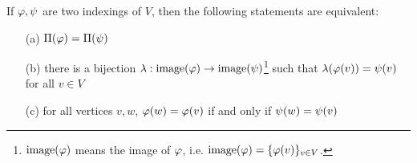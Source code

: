 \begin{samepage}
    \begin{theoremrep}
        If $\varphi,\psi$ are two indexings of $V$, then the following statements are equivalent:
        \begin{enumerate}
            \item[(a)] $\Pi(\varphi)=\Pi(\psi)$
            \item[(b)] there is a bijection $\lambda : \mathrm{image}(\varphi) \rightarrow \mathrm{image}(\psi)$\footnote{$\mathrm{image}(\varphi)$ means the image of $\varphi$, i.e. $\mathrm{image}(\varphi)=\{ \varphi(v) \}_{v \in V}$.} such that $\lambda(\varphi(v)) = \psi(v)$ \\ for all $v \in V$
            \item[(c)] for all vertices $v,w$, $\varphi(w) = \varphi(v)$ if and only if $\psi(w) = \psi(v)$
        \end{enumerate} \label{theorem:equal_indexings}
    \end{theoremrep}
\end{samepage}
